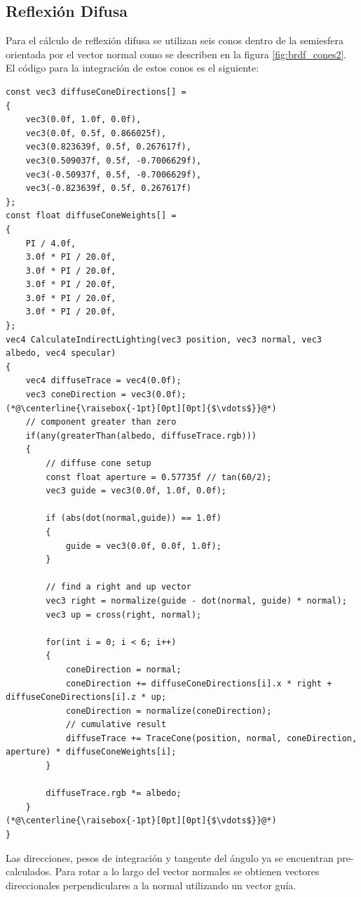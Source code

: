 \subsection{Reflexión Difusa} %
\label{sub:reflexion_difuse}
Para el cálculo de reflexión difusa se utilizan seis conos dentro de la semiesfera orientada por el vector normal como se describen en la figura \ref{fig:brdf_cones2}. El código para la integración de estos conos es el siguiente:
\\
\begin{lstlisting}[caption={Conos para reflexión difusa.}, label=Trace3]
const vec3 diffuseConeDirections[] =
{
    vec3(0.0f, 1.0f, 0.0f),
    vec3(0.0f, 0.5f, 0.866025f),
    vec3(0.823639f, 0.5f, 0.267617f),
    vec3(0.509037f, 0.5f, -0.7006629f),
    vec3(-0.50937f, 0.5f, -0.7006629f),
    vec3(-0.823639f, 0.5f, 0.267617f)
};
const float diffuseConeWeights[] =
{
    PI / 4.0f,
    3.0f * PI / 20.0f,
    3.0f * PI / 20.0f,
    3.0f * PI / 20.0f,
    3.0f * PI / 20.0f,
    3.0f * PI / 20.0f,
};
vec4 CalculateIndirectLighting(vec3 position, vec3 normal, vec3 albedo, vec4 specular)
{
    vec4 diffuseTrace = vec4(0.0f);
    vec3 coneDirection = vec3(0.0f);
(*@\centerline{\raisebox{-1pt}[0pt][0pt]{$\vdots$}}@*)
    // component greater than zero
    if(any(greaterThan(albedo, diffuseTrace.rgb)))
    {
        // diffuse cone setup
        const float aperture = 0.57735f // tan(60/2);
        vec3 guide = vec3(0.0f, 1.0f, 0.0f);

        if (abs(dot(normal,guide)) == 1.0f)
        {
            guide = vec3(0.0f, 0.0f, 1.0f);
        }

        // find a right and up vector
        vec3 right = normalize(guide - dot(normal, guide) * normal);
        vec3 up = cross(right, normal);

        for(int i = 0; i < 6; i++)
        {
            coneDirection = normal;
            coneDirection += diffuseConeDirections[i].x * right + diffuseConeDirections[i].z * up;
            coneDirection = normalize(coneDirection);
            // cumulative result
            diffuseTrace += TraceCone(position, normal, coneDirection, aperture) * diffuseConeWeights[i];
        }

        diffuseTrace.rgb *= albedo;
    }
(*@\centerline{\raisebox{-1pt}[0pt][0pt]{$\vdots$}}@*)
}
\end{lstlisting}
Las direcciones, pesos de integración y tangente del ángulo ya se encuentran pre-calculados. Para rotar a lo largo del vector normales se obtienen vectores direccionales perpendiculares a la normal utilizando un vector guía.
